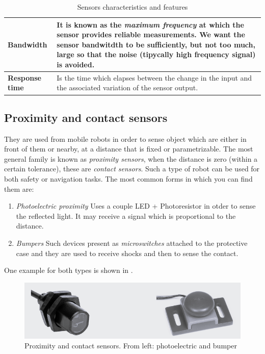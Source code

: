 \begin{table}
\begin{tabular}{p{5.5cm} p{9.5cm}}
        \midrule
        \textbf{Bandwidth}&{It is known as the \textit{maximum frequency} at which the sensor provides reliable measurements. We want the sensor bandwitdth to be sufficiently, but not too much, large so that the noise (tipycally high frequency signal) is avoided.}\\
        \midrule
        \textbf{Response time}&{Is the time which elapses between the change in the input and the associated variation of the sensor output. }\\
        \bottomrule
    \end{tabular}
    \caption{Sensors characteristics and features}
    \label{tab:sensfeature}
\end{table}

\subsection{Proximity and contact sensors}
They are used from mobile robots in order to sense object which are either in front of them or nearby, at a distance that is fixed or parametrizable. The most general family is known as \textit{proximity sensors}, when the distance is zero (within a certain tolerance), these are \textit{contact sensors}. Such a type of robot can be used for both safety or navigation tasks. The most common forms in which you can find them are:
\begin{enumerate}
    \itemsep-0.3em
    \item \textit{Photoelectric proximity} Uses a couple LED + Photoresistor in otder to sense the reflected light. It may receive a signal which is proportional to the distance.
    \item \textit{Bumpers} Such devices present as \textit{microswitches} attached to the protective case and they are used to receive shocks and then to sense the contact.
\end{enumerate}
One example for both types is shown in .

\begin{figure}
    \centering
    \includegraphics[scale=0.7]{img/sens_proximity.png}
    \caption{Proximity and contact sensors. From left: photoelectric and bumper}
    \label{fig:proximity}
\end{figure}


